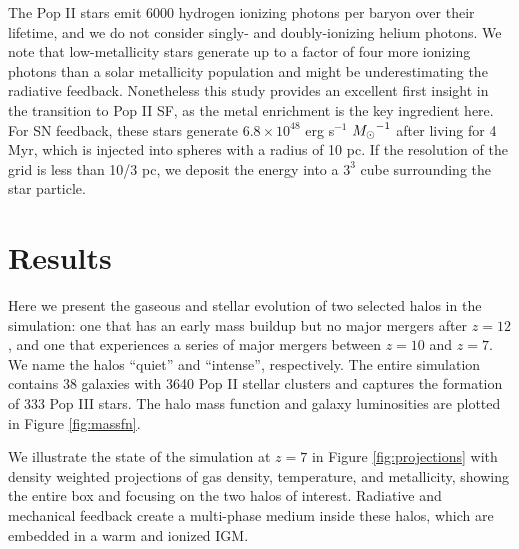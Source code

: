\documentclass[12pt,preprint]{aastex}
\newcommand{\Ms}{\ifmmode{M_\odot}\else{$M_\odot$}\fi}
\begin{document}
The Pop II stars emit 6000 hydrogen ionizing photons per baryon over
their lifetime, and we do not consider singly- and doubly-ionizing
helium photons.  We note that low-metallicity stars generate up to a
factor of four more ionizing photons than a solar metallicity
population \citep{Schaerer03} and might be underestimating the
radiative feedback.  Nonetheless this study provides an excellent
first insight in the transition to Pop II SF, as the metal enrichment
is the key ingredient here.  For SN feedback, these stars generate
$6.8 \times 10^{48}$ erg s$^{-1}$ $\Ms^{-1}$ after living for 4 Myr,
which is injected into spheres with a radius of 10 pc.  If the
resolution of the grid is less than 10/3 pc, we deposit the energy
into a $3^3$ cube surrounding the star particle.

\begin{figure*}
\caption{\label{fig:evo} (a) Evolution of the total halo mass (top),
  stellar mass (middle), and gas fraction (bottom) of the quiet
  (dashed) and intense (solid) halos.  (b) Mass-weighted stellar
  metallicities and gas metallicities enriched by Pop II and Pop III
  SNe of the intense (top) and quiet (bottom) halos.}
\end{figure*}

\section{Results}
\label{sec:results}

Here we present the gaseous and stellar evolution of two selected
halos in the simulation: one that has an early mass buildup but no
major mergers after $z=12$, and one that experiences a series of major
mergers between $z=10$ and $z=7$.  We name the halos ``quiet'' and
``intense'', respectively.  The entire simulation contains 38 galaxies
with 3640 Pop II stellar clusters and captures the formation of 333
Pop III stars.  The halo mass function and galaxy luminosities are
plotted in Figure \ref{fig:massfn}.


We illustrate the state of the simulation at $z=7$ in Figure
\ref{fig:projections} with density weighted projections of gas
density, temperature, and metallicity, showing the entire box and
focusing on the two halos of interest.  Radiative and mechanical
feedback create a multi-phase medium inside these halos, which are
embedded in a warm and ionized IGM.
\end{document}
